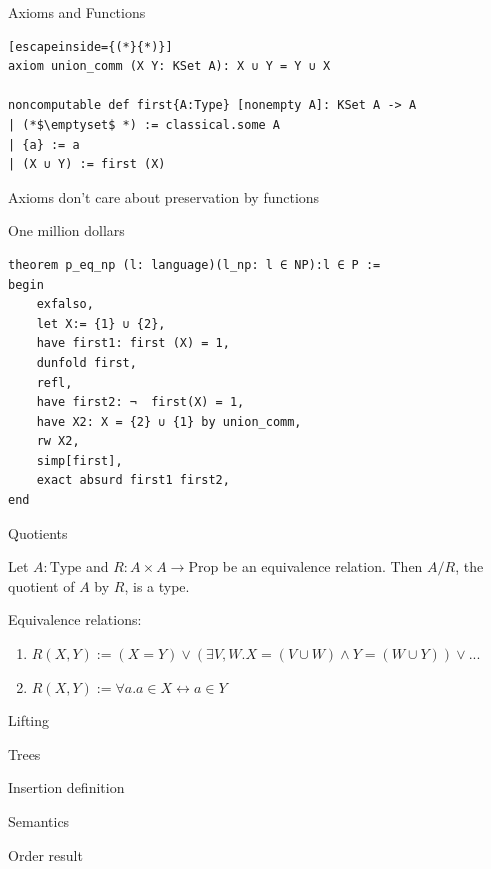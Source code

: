\documentclass{beamer}
\begin{document}
    \begin{frame}[fragile]{Axioms and Functions}
        \begin{lstlisting}[escapeinside={(*}{*)}]
axiom union_comm (X Y: KSet A): X ∪ Y = Y ∪ X

noncomputable def first{A:Type} [nonempty A]: KSet A -> A
| (*$\emptyset$ *) := classical.some A
| {a} := a
| (X ∪ Y) := first (X)
    \end{lstlisting}
        \begin{block}{}
            Axioms don't care about preservation by functions
        \end{block}
    \end{frame}
    \begin{frame}[fragile]{One million dollars}
        \begin{lstlisting}
theorem p_eq_np (l: language)(l_np: l ∈ NP):l ∈ P :=
begin
    exfalso,
    let X:= {1} ∪ {2},
    have first1: first (X) = 1,
    dunfold first,
    refl,
    have first2: ¬  first(X) = 1,
    have X2: X = {2} ∪ {1} by union_comm,
    rw X2,
    simp[first],
    exact absurd first1 first2,
end
            \end{lstlisting}
    \end{frame}
    \begin{frame}{Quotients}
        \begin{definition}
            Let $A: \text{{Type}}$ and $R: A \times A \to \text{{Prop}}$ be an equivalence relation.
            Then $A/R$, the quotient of $A$ by $R$, is a type.
        \end{definition}
    \pause
    Equivalence relations:
    \begin{enumerate}[<+->]
        \item $R(X,Y) := (X = Y) \lor (\exists V, W. X= (V \cup W) \land Y = (W \cup Y)) \lor ...$
        \item $R(X,Y) := \forall a. a \in X \leftrightarrow a \in Y$
    \end{enumerate}

    \end{frame}
    \begin{frame}{Lifting}
    
    \end{frame}
    \begin{frame}{Trees}
        
    \end{frame}
    \begin{frame}{Insertion}
        definition

        Semantics

        Order result
    \end{frame}
\end{document}
